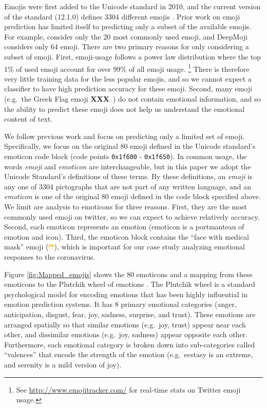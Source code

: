 \documentclass[11pt]{article}
\newcommand{\defn}[1]{\emph{{#1}}}
\newcommand{\XXX}{{\textbf{XXX}}~}
\begin{document}
Emojis were first added to the Unicode standard in 2010,
and the current version of the standard (12.1.0) defines 3304 different emojis \citep{unicode12}.
Prior work on emoji prediction has limited itself to predicting only a subset of the available emojis.
For example, \citet{barbieri2017emojis} consider only the 20 most commonly used emoji,
and DeepMoji \citep{felbo2017using} considers only 64 emoji.
There are two primary reasons for only considering a subset of emoji.
First, emoji-usage follows a power law distribution where the top 1\% of used emoji account for over 99\% of all emoji usage.%
\footnote{
    See \url{http://www.emojitracker.com/} for real-time stats on Twitter emoji usage.
}
There is therefore very little training data for the less popular emojis,
and so we cannot expect a classifier to have high prediction accuracy for these emoji.
Second, many emoji (e.g.\ the Greek Flag emoji \XXX) do not contain emotional information,
and so the ability to predict these emoji does not help us understand the emotional content of text.

We follow previous work and focus on predicting only a limited set of emoji.
Specifically, we focus on the original 80 emoji defined in the Unicode standard's emoticon code block (code points \texttt{0x1f600} - \texttt{0x1f650}). %
    In common usage, the words \defn{emoji} and \defn{emoticon} are interchangeable,
    but in this paper we adopt the Unicode Standard's definitions of these terms.
    By these definitions, an \defn{emoji} is any one of 3304 pictographs that are not part of any written language,
    and an \defn{emoticon} is one of the original 80 emoji defined in the code block specified above.
We limit are analysis to emoticons for three reasons.
First, they are the most commonly used emoji on twitter,
so we can expect to achieve relatively accuracy.
Second, each emoticon represents an emotion (emoticon is a portmanteau of emotion and icon).
Third, the emoticon block contains the ``face with medical mask'' emoji (\includegraphics[height=0.8em]{images/mask_photo.png}),
which is important for our case study analyzing emotional responses to the coronavirus.

Figure \ref{fig:Mapped_emojis} shows the 80 emoticons and a mapping from these emoticons to the Plutchik wheel of emotions \citep{plutchik1991emotions}.
The Plutchik wheel is a standard psychological model for encoding emotions that has been highly influential in emotion prediction systems.
It has 8 primary emotional categories (anger, anticipation, disgust, fear, joy, sadness, surprise, and trust).
These emotions are arranged spatially so that similar emotions (e.g.\ joy, trust) appear near each other, and dissimilar emotions (e.g.\ joy, sadness) appear opposite each other.
Furthermore, each emotional category is broken down into sub-categories called ``valences'' that encode the strength of the emotion (e.g.\ ecstasy is an extreme, and serenity is a mild version of joy).
\end{document}
